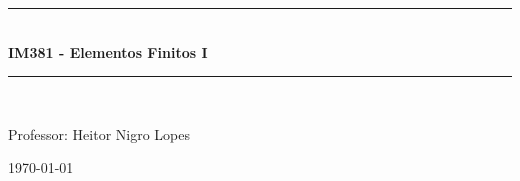 

\newcommand{\HRule}{\rule{\linewidth}{0.5mm}} %

\vspace*{6cm}
\begin{center}

\HRule \\[0.4cm]
{ \huge \bfseries IM381 - Elementos Finitos I}\\[0.4cm] %
\HRule \\[1.0cm]

\vspace*{2cm}

Professor: Heitor Nigro Lopes


\vspace*{12cm}

\today

\end{center}